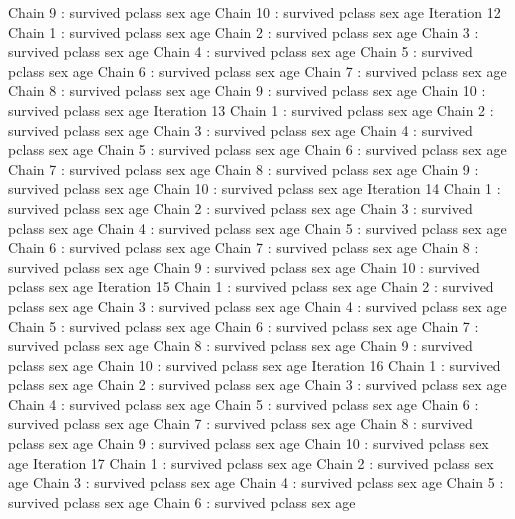 \begin{Schunk}
\begin{Soutput}
 Chain 9 : survived   pclass   sex   age   
 Chain 10 : survived   pclass   sex   age   
Iteration 12 
 Chain 1 : survived   pclass   sex   age   
 Chain 2 : survived   pclass   sex   age   
 Chain 3 : survived   pclass   sex   age   
 Chain 4 : survived   pclass   sex   age   
 Chain 5 : survived   pclass   sex   age   
 Chain 6 : survived   pclass   sex   age   
 Chain 7 : survived   pclass   sex   age   
 Chain 8 : survived   pclass   sex   age   
 Chain 9 : survived   pclass   sex   age   
 Chain 10 : survived   pclass   sex   age   
Iteration 13 
 Chain 1 : survived   pclass   sex   age   
 Chain 2 : survived   pclass   sex   age   
 Chain 3 : survived   pclass   sex   age   
 Chain 4 : survived   pclass   sex   age   
 Chain 5 : survived   pclass   sex   age   
 Chain 6 : survived   pclass   sex   age   
 Chain 7 : survived   pclass   sex   age   
 Chain 8 : survived   pclass   sex   age   
 Chain 9 : survived   pclass   sex   age   
 Chain 10 : survived   pclass   sex   age   
Iteration 14 
 Chain 1 : survived   pclass   sex   age   
 Chain 2 : survived   pclass   sex   age   
 Chain 3 : survived   pclass   sex   age   
 Chain 4 : survived   pclass   sex   age   
 Chain 5 : survived   pclass   sex   age   
 Chain 6 : survived   pclass   sex   age   
 Chain 7 : survived   pclass   sex   age   
 Chain 8 : survived   pclass   sex   age   
 Chain 9 : survived   pclass   sex   age   
 Chain 10 : survived   pclass   sex   age   
Iteration 15 
 Chain 1 : survived   pclass   sex   age   
 Chain 2 : survived   pclass   sex   age   
 Chain 3 : survived   pclass   sex   age   
 Chain 4 : survived   pclass   sex   age   
 Chain 5 : survived   pclass   sex   age   
 Chain 6 : survived   pclass   sex   age   
 Chain 7 : survived   pclass   sex   age   
 Chain 8 : survived   pclass   sex   age   
 Chain 9 : survived   pclass   sex   age   
 Chain 10 : survived   pclass   sex   age   
Iteration 16 
 Chain 1 : survived   pclass   sex   age   
 Chain 2 : survived   pclass   sex   age   
 Chain 3 : survived   pclass   sex   age   
 Chain 4 : survived   pclass   sex   age   
 Chain 5 : survived   pclass   sex   age   
 Chain 6 : survived   pclass   sex   age   
 Chain 7 : survived   pclass   sex   age   
 Chain 8 : survived   pclass   sex   age   
 Chain 9 : survived   pclass   sex   age   
 Chain 10 : survived   pclass   sex   age   
Iteration 17 
 Chain 1 : survived   pclass   sex   age   
 Chain 2 : survived   pclass   sex   age   
 Chain 3 : survived   pclass   sex   age   
 Chain 4 : survived   pclass   sex   age   
 Chain 5 : survived   pclass   sex   age   
 Chain 6 : survived   pclass   sex   age   

\end{Soutput}
\end{Schunk}
